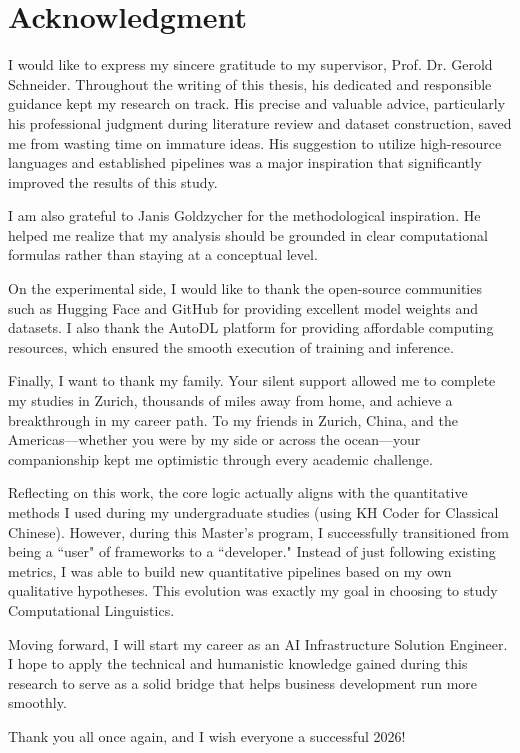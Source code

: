 \documentclass[../CLthesis.tex]{subfiles}
\begin{document}
\chapter*{Acknowledgment}

I would like to express my sincere gratitude to my supervisor, Prof. Dr. Gerold Schneider. Throughout the writing of this thesis, his dedicated and responsible guidance kept my research on track. His precise and valuable advice, particularly his professional judgment during literature review and dataset construction, saved me from wasting time on immature ideas. His suggestion to utilize high-resource languages and established pipelines was a major inspiration that significantly improved the results of this study.

I am also grateful to Janis Goldzycher for the methodological inspiration. He helped me realize that my analysis should be grounded in clear computational formulas rather than staying at a conceptual level.

On the experimental side, I would like to thank the open-source communities such as Hugging Face and GitHub for providing excellent model weights and datasets. I also thank the AutoDL platform for providing affordable computing resources, which ensured the smooth execution of training and inference.

Finally, I want to thank my family. Your silent support allowed me to complete my studies in Zurich, thousands of miles away from home, and achieve a breakthrough in my career path. To my friends in Zurich, China, and the Americas—whether you were by my side or across the ocean—your companionship kept me optimistic through every academic challenge.

Reflecting on this work, the core logic actually aligns with the quantitative methods I used during my undergraduate studies (using KH Coder for Classical Chinese). However, during this Master's program, I successfully transitioned from being a ``user" of frameworks to a ``developer." Instead of just following existing metrics, I was able to build new quantitative pipelines based on my own qualitative hypotheses. This evolution was exactly my goal in choosing to study Computational Linguistics.

Moving forward, I will start my career as an AI Infrastructure Solution Engineer. I hope to apply the technical and humanistic knowledge gained during this research to serve as a solid bridge that helps business development run more smoothly.

Thank you all once again, and I wish everyone a successful 2026!

\newpage
\end{document}
